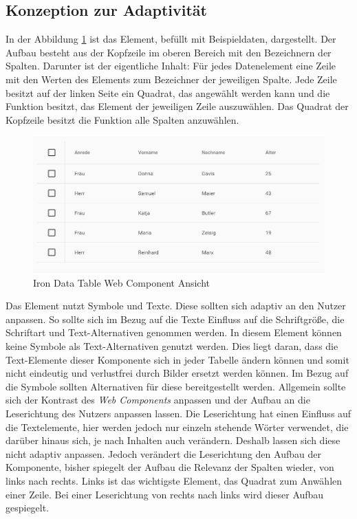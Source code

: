 \documentclass[12pt, paper=a4, bibtotoc, toc=listof, headsepline=true, numbers=endperiod]{scrreprt}
\begin{document}
	\subsection{Konzeption zur Adaptivität}
	\label{sec:konZurAda}
	In der Abbildung \ref{img:datTab} ist das Element, befüllt mit Beispieldaten, dargestellt. Der Aufbau besteht aus der Kopfzeile im oberen Bereich mit den Bezeichnern der Spalten. Darunter ist der eigentliche Inhalt: Für jedes Datenelement eine Zeile mit den Werten des Elements zum Bezeichner der jeweiligen Spalte. Jede Zeile besitzt auf der linken Seite ein Quadrat, das angewählt werden kann und die Funktion besitzt, das Element der jeweiligen Zeile auszuwählen. Das Quadrat der Kopfzeile besitzt die Funktion alle Spalten anzuwählen.
	\begin{figure}[H]		
		\centering
		\includegraphics[width=\textwidth,height=\textheight,keepaspectratio]{datTab.png}
		\caption[Iron Data Table]{Iron Data Table Web Component Ansicht \cite{saulis}}
		\label{img:datTab}
	\end{figure}\noindent
	Das Element nutzt Symbole und Texte. Diese sollten sich adaptiv an den Nutzer anpassen. So sollte sich im Bezug auf die Texte Einfluss auf die Schriftgröße, die Schriftart und Text-Alternativen genommen werden. In diesem Element können keine Symbole als Text-Alternativen genutzt werden. Dies liegt daran, dass die Text-Elemente dieser Komponente sich in jeder Tabelle ändern können und somit nicht eindeutig und verlustfrei durch Bilder ersetzt werden können. Im Bezug auf die Symbole sollten Alternativen für diese bereitgestellt werden. Allgemein sollte sich der Kontrast des \emph{Web Components} anpassen und der Aufbau an die Leserichtung des Nutzers anpassen lassen. Die Leserichtung hat einen Einfluss auf die Textelemente, hier werden jedoch nur einzeln stehende Wörter verwendet, die darüber hinaus sich, je nach Inhalten auch verändern. Deshalb lassen sich diese nicht adaptiv anpassen. Jedoch verändert die Leserichtung den Aufbau der Komponente, bisher spiegelt der Aufbau die Relevanz der Spalten wieder, von links nach rechts. Links ist das wichtigste Element, das Quadrat zum Anwählen einer Zeile. Bei einer Leserichtung von rechts nach links wird dieser Aufbau gespiegelt.  
\end{document}

